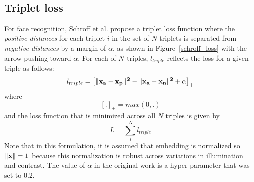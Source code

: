 \begin{figure}[htb]
    ~ 
    ~ 
\end{figure}

\subsection{Triplet loss}

For face recognition, Schroff et al. \cite{DBLP:conf/cvpr/SchroffKP15}
propose a triplet loss function where the \textit{positive distances}
for each triplet $i$ in the set of $N$ triplets is separated from
\textit{negative distances} by a margin of $\alpha$, as shown in
Figure~\ref{schroff_loss} with the arrow pushing toward $\alpha$.  For
each of $N$ triples, $l_{triple}$ reflects the loss for a given triple
as follows: 
\begin{equation}
  l_{triple} =  \left[\|\bf{x_a} - \bf{x_p}\|^2 - \|\bf{x_a} -\bf{x_n}\|^2 + \alpha \right]_+
\label{schroff}
\end{equation}
where
\begin{equation}
 \left[.\right]_{+} = max(0, .)
\end{equation}
and the loss function that is minimized across all $N$ triples is given by
\begin{equation}
 L = \sum_{i}^{N} l_{triple}
\end{equation}
Note that in this formulation, it is assumed that embedding is normalized so $\|\bf{x} \| = 1$ because this normalization is robust across variations in illumination and contrast.  The value of $\alpha$ in the original work is a hyper-parameter that \cite{DBLP:conf/cvpr/SchroffKP15} was set to 0.2.

